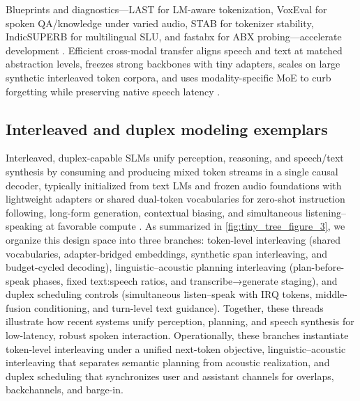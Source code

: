 Blueprints and diagnostics—LAST for LM-aware tokenization, VoxEval for spoken QA/knowledge under varied audio, STAB for tokenizer stability, IndicSUPERB for multilingual SLU, and fastabx for ABX probing—accelerate development \cite{turetzky2024lastlanguagemodelawarespeechtokenization,cui2025voxevalbenchmarkingknowledgeunderstandin,vashishth2024stabspeechtokenizerassessmentbenchmark,entry2025indicsuperbspeechprocessinguniversalperf,poli2025fastabxlibraryefficientcomputationabxdis}. Efficient cross-modal transfer aligns speech and text at matched abstraction levels, freezes strong backbones with tiny adapters, scales on large synthetic interleaved token corpora, and uses modality-specific MoE to curb forgetting while preserving native speech latency \cite{cuervo2025textspeechlanguagemodelsimprovedcrossmod,shao2025deeptalktowardsseamlesssmartspeechintera,wang2023slmbridgethingapbetweenspeechtextfoundat,zeng2024scalingspeechtextpretrainingsyntheticint,entry2025towardjointlanguagemodelingspeechunitste}.

\subsection{Interleaved and duplex modeling exemplars} \label{subsec:Interleaved and duplex modeling exemplars}
Interleaved, duplex-capable SLMs unify perception, reasoning, and speech/text synthesis by consuming and producing mixed token streams in a single causal decoder, typically initialized from text LMs and frozen audio foundations with lightweight adapters or shared dual-token vocabularies for zero-shot instruction following, long-form generation, contextual biasing, and simultaneous listening–speaking at favorable compute \cite{maimon2025scalinganalysisinterleavedspeechtextlang,park2025longformspeechgenerationspokenlanguagemo,wang2023slmbridgethingapbetweenspeechtextfoundat,wang2025dualspeechlmtowardsunifiedspeechundersta,entry2025towardjointlanguagemodelingspeechunitste}. As summarized in \autoref{fig:tiny_tree_figure_3}, we organize this design space into three branches: token-level interleaving (shared vocabularies, adapter-bridged embeddings, synthetic span interleaving, and budget-cycled decoding), linguistic–acoustic planning interleaving (plan-before-speak phases, fixed text:speech ratios, and transcribe→generate staging), and duplex scheduling controls (simultaneous listen–speak with IRQ tokens, middle-fusion conditioning, and turn-level text guidance). Together, these threads illustrate how recent systems unify perception, planning, and speech synthesis for low-latency, robust spoken interaction. Operationally, these branches instantiate token-level interleaving under a unified next-token objective, linguistic–acoustic interleaving that separates semantic planning from acoustic realization, and duplex scheduling that synchronizes user and assistant channels for overlaps, backchannels, and barge-in.

